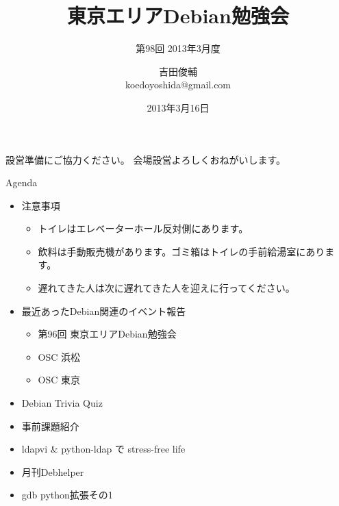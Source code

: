 \title{東京エリアDebian勉強会}
\subtitle{第98回 2013年3月度}
\author{吉田俊輔\\koedoyoshida@gmail.com}
\date{2013年3月16日}



\frame{\titlepage{}}

\begin{frame}{設営準備にご協力ください。}
会場設営よろしくおねがいします。
\end{frame}

\begin{frame}{Agenda}
\begin{minipage}[t]{0.45\hsize}
  \begin{itemize}
  \item 注意事項
	\begin{itemize}
	 \item トイレはエレベーターホール反対側にあります。
	 \item 飲料は手動販売機があります。ゴミ箱はトイレの手前給湯室にあります。
	 \item 遅れてきた人は次に遅れてきた人を迎えに行ってください。
	\end{itemize}
 \end{itemize}
\end{minipage} 
\begin{minipage}[t]{0.45\hsize}
 \begin{itemize}
   \item 最近あったDebian関連のイベント報告
	\begin{itemize}
        \item 第96回 東京エリアDebian勉強会
        \item OSC 浜松
        \item OSC 東京
	\end{itemize}
  \item Debian Trivia Quiz
  \item 事前課題紹介
  \item ldapvi \& python-ldap で stress-free life
  \item 月刊Debhelper
  \item gdb python拡張その1
 \end{itemize}
\end{minipage}
\end{frame}


